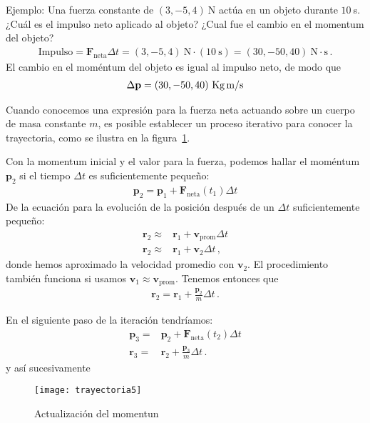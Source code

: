 Ejemplo: Una fuerza constante de $(3,-5,4)\ $N actúa en un objeto durante $10\ $s. ¿Cuál es el impulso neto aplicado al objeto? ¿Cual fue el cambio en el momentum del objeto?
\begin{align}
\text{Impulso}=\mathbf{F}_{\text{neta}}\Delta t=(3,-5,4)\ \text{N}\cdot (10\ \text{s})=
(30,-50,40)\ \text{N}\cdot\text{s}\,.
\end{align}
El cambio en el moméntum del objeto es igual al impulso neto, de modo que
\begin{align}
  \Delta \mathbf{p}=(30,-50,40)\ \text{Kg\,m/s}
\end{align}

Cuando conocemos una expresión para la fuerza neta actuando sobre un cuerpo de masa constante $m$, es posible establecer un proceso iterativo para conocer la trayectoria, como se ilustra en la figura~\ref{fig:predtray}.

Con la momentum inicial y el valor para la fuerza, podemos hallar el moméntum $\mathbf{p}_2$ si el tiempo $\Delta t$ es suficientemente pequeño:
\begin{align*}
  \mathbf{p}_2=\mathbf{p}_1+\mathbf{F}_{\text{neta}}(t_1)\Delta t
\end{align*}
De la ecuación para la evolución de la posición después de un $\Delta t$ suficientemente pequeño:
\begin{align*}
  \mathbf{r}_2\approx&\mathbf{r}_1+\mathbf{v}_{\text{prom}}\Delta t\nonumber\\
  \mathbf{r}_2\approx&\mathbf{r}_1+\mathbf{v}_2\Delta t\,,
\end{align*}
donde hemos aproximado la velocidad promedio con $\mathbf{v}_2$. El procedimiento también funciona si usamos $\mathbf{v}_1\approx\mathbf{v}_{\text{prom}}$. Tenemos entonces que
\begin{align*}
    \mathbf{r}_2=\mathbf{r}_1+\frac{\mathbf{p}_2}{m}\Delta t\,.
\end{align*}

En el siguiente paso de la iteración tendríamos:
\begin{align*}
  \mathbf{p}_3=&\mathbf{p}_2+\mathbf{F}_{\text{neta}}(t_2)\Delta t\nonumber\\
    \mathbf{r}_3=&\mathbf{r}_2+\frac{\mathbf{p}_3}{m}\Delta t\,.
\end{align*}
y así sucesivamente 
\begin{frame}
  \begin{figure}
    \centering
{\texttt{[image: trayectoria5]}}
    \caption{Actualización del momentun}
    \label{fig:predtray}
  \end{figure}
\end{frame}

